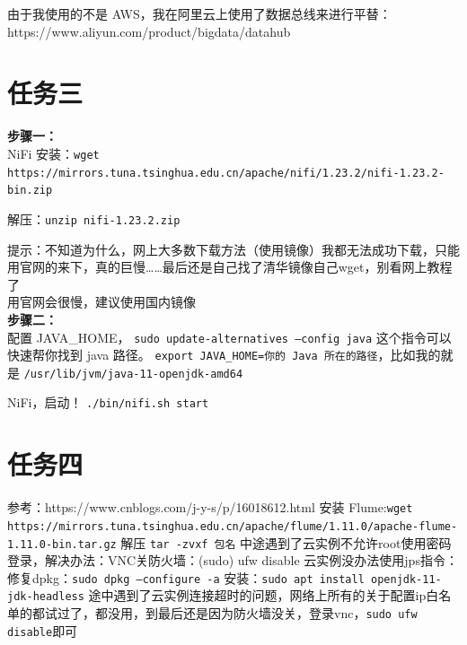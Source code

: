 \documentclass{article}
\begin{document}
由于我使用的不是 AWS，我在阿里云上使用了数据总线来进行平替：https://www.aliyun.com/product/bigdata/datahub

\section*{任务三}

\textbf{步骤一：}\\
NiFi 安装：\texttt{wget https://mirrors.tuna.tsinghua.edu.cn/apache/nifi/1.23.2/nifi-1.23.2-bin.zip}

解压：\texttt{unzip nifi-1.23.2.zip}

提示：不知道为什么，网上大多数下载方法（使用镜像）我都无法成功下载，只能用官网的来下，真的巨慢……最后还是自己找了清华镜像自己wget，别看网上教程了\\

用官网会很慢，建议使用国内镜像\\
\textbf{步骤二：}\\
配置 JAVA\_HOME， \texttt{sudo update-alternatives --config java} 这个指令可以快速帮你找到 java 路径。
\texttt{export JAVA\_HOME=你的 Java 所在的路径}，比如我的就是 \texttt{/usr/lib/jvm/java-11-openjdk-amd64}

NiFi，启动！  \texttt{./bin/nifi.sh start}

\section*{任务四}
参考：https://www.cnblogs.com/j-y-s/p/16018612.html
安装 Flume:\texttt{wget https://mirrors.tuna.tsinghua.edu.cn/apache/flume/1.11.0/apache-flume-1.11.0-bin.tar.gz}
解压 \texttt{tar -zvxf 包名}
中途遇到了云实例不允许root使用密码登录，解决办法：VNC关防火墙：(sudo) ufw disable
云实例没办法使用jps指令：
修复dpkg：\texttt{sudo dpkg --configure -a}
安装：\texttt{sudo apt install openjdk-11-jdk-headless}
途中遇到了云实例连接超时的问题，网络上所有的关于配置ip白名单的都试过了，都没用，到最后还是因为防火墙没关，登录vnc，\texttt{sudo ufw disable}即可
\end{document}

